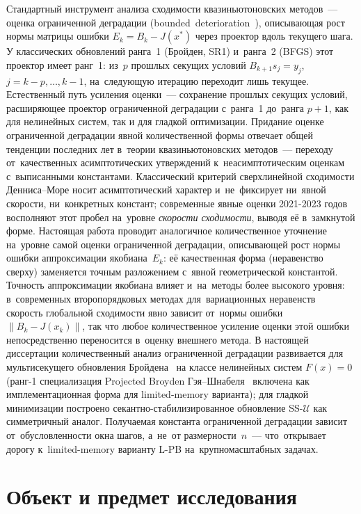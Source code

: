 Стандартный инструмент анализа сходимости квазиньютоновских
методов~--- оценка ограниченной деградации
(bounded~deterioration~\cite{broyden1973,dennis1996}), описывающая
рост нормы матрицы ошибки $E_k = B_k - J(x^*)$ через проектор вдоль
текущего шага. У классических обновлений ранга~1 (Бройден, SR1)
и~ранга~2 (BFGS) этот проектор имеет ранг~1: из~$p$ прошлых секущих
условий $B_{k+1}s_j = y_j$, $j = k{-}p,\ldots,k{-}1$, на~следующую
итерацию переходит лишь текущее. Естественный путь усиления
оценки~--- сохранение прошлых секущих условий, расширяющее проектор
ограниченной деградации с~ранга~1 до~ранга $p{+}1$, как для нелинейных
систем, так и для гладкой оптимизации. 
Придание оценке ограниченной
деградации явной количественной формы отвечает общей тенденции последних
лет в~теории квазиньютоновских методов~--- переходу от~качественных
асимптотических утверждений к~неасимптотическим оценкам с~выписанными
константами. Классический критерий сверхлинейной сходимости
Денниса--Море носит асимптотический характер и~не~фиксирует ни~явной
скорости, ни~конкретных констант; современные явные
оценки 2021-2023 годов ~\cite{rodomanov2021greedy,rodomanov2022rates,jin2023nonasymp,lin2022explicit}
восполняют этот пробел на~уровне \emph{скорости сходимости}, выводя её
в~замкнутой форме. Настоящая работа проводит аналогичное количественное
уточнение на~уровне самой оценки ограниченной деградации, описывающей
рост нормы ошибки аппроксимации якобиана~$E_k$: её качественная форма
(неравенство сверху) заменяется точным разложением с~явной
геометрической константой.
Точность аппроксимации якобиана
влияет и~на~методы более высокого уровня: в~современных
второпорядковых методах для~вариационных неравенств~\cite{viqa2024}
скорость глобальной сходимости явно зависит от~нормы ошибки
$\|B_k - J(x_k)\|$, так что любое количественное усиление оценки этой
ошибки непосредственно переносится в~оценку внешнего метода. В
настоящей диссертации количественный анализ ограниченной деградации
развивается для мультисекущего обновления Бройдена~\cite{schnabel1983}
на классе нелинейных систем $F(x) = 0$ (ранг-1 специализация
Projected Broyden Гэя--Шнабеля~\cite{gay_schnabel1978} включена как
имплементационная форма для limited-memory варианта); для гладкой
минимизации построено секантно-стабилизированное обновление
SS-$\mathcal{U}$ как симметричный аналог. Получаемая константа
ограниченной деградации зависит от~обусловленности окна шагов,
а~не~от размерности~$n$~--- что~открывает дорогу к~limited-memory
варианту L-PB на~крупномасштабных задачах.

\section*{Объект и предмет исследования}

